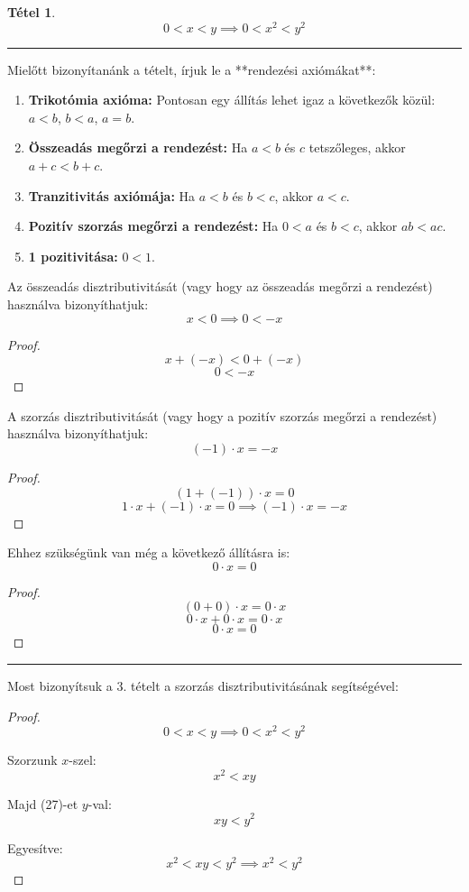 \documentclass{article}
\newtheorem{theorem}{Tétel}
\begin{document}
\begin{theorem}
    \[
    0 < x < y \implies 0 < x^2 < y^2
    \]
\end{theorem}

\hrule
\vspace{1em}

Mielőtt bizonyítanánk a tételt, írjuk le a **rendezési axiómákat**:

\begin{enumerate}
    \item \textbf{Trikotómia axióma:} Pontosan egy állítás lehet igaz a következők közül: $a < b$, $b < a$, $a = b$.
    \item \textbf{Összeadás megőrzi a rendezést:} Ha $a < b$ és $c$ tetszőleges, akkor $a+c < b+c$.
    \item \textbf{Tranzitivitás axiómája:} Ha $a < b$ és $b < c$, akkor $a < c$.
    \item \textbf{Pozitív szorzás megőrzi a rendezést:} Ha $0 < a$ és $b < c$, akkor $ab < ac$.
    \item \textbf{1 pozitivitása:} $0 < 1$.
\end{enumerate}

Az összeadás disztributivitását (vagy hogy az összeadás megőrzi a rendezést) használva bizonyíthatjuk:
\[
x < 0 \implies 0 < -x
\]

\begin{proof}
\[
x + (-x) < 0 + (-x)
\]
\[
0 < -x
\]
\end{proof}

A szorzás disztributivitását (vagy hogy a pozitív szorzás megőrzi a rendezést) használva bizonyíthatjuk:
\[
(-1)\cdot x = -x
\]

\begin{proof}
\[
(1 + (-1)) \cdot x = 0
\]
\[
1 \cdot x + (-1) \cdot x = 0 \implies (-1)\cdot x = -x
\]
\end{proof}

Ehhez szükségünk van még a következő állításra is:
\[
0 \cdot x = 0
\]

\begin{proof}
\[
(0+0)\cdot x = 0\cdot x
\]
\[
0\cdot x + 0\cdot x = 0\cdot x
\]
\[
0\cdot x = 0
\]
\end{proof}

\hrule
\vspace{1em}

Most bizonyítsuk a 3. tételt a szorzás disztributivitásának segítségével:

\begin{proof}
\begin{equation}
0 < x < y \implies 0 < x^2 < y^2
\end{equation}

Szorzunk $x$-szel:
\[
x^2 < xy
\]

Majd (27)-et $y$-val:
\[
xy < y^2
\]

Egyesítve:
\[
x^2 < xy < y^2 \implies x^2 < y^2
\]
\end{proof}
\end{document}
